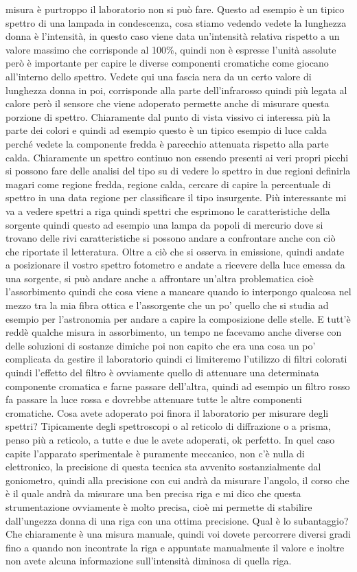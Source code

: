 misura è purtroppo il laboratorio non si può fare. Questo ad esempio è un tipico spettro di una lampada in condescenza, cosa stiamo vedendo vedete la lunghezza donna è l'intensità, in questo caso viene data un'intensità relativa rispetto a un valore massimo che corrisponde al 100\%, quindi non è espresse l'unità assolute però è importante per capire le diverse componenti cromatiche come giocano all'interno dello spettro. Vedete qui una fascia nera da un certo valore di lunghezza donna in poi, corrisponde alla parte dell'infrarosso quindi più legata al calore però il sensore che viene adoperato permette anche di misurare questa porzione di spettro. Chiaramente dal punto di vista vissivo ci interessa più la parte dei colori e quindi ad esempio questo è un tipico esempio di luce calda perché vedete la componente fredda è parecchio attenuata rispetto alla parte calda. Chiaramente un spettro continuo non essendo presenti ai veri propri picchi si possono fare delle analisi del tipo su di vedere lo spettro in due regioni definirla magari come regione fredda, regione calda, cercare di capire la percentuale di spettro in una data regione per classificare il tipo insurgente. Più interessante mi va a vedere spettri a riga quindi spettri che esprimono le caratteristiche della sorgente quindi questo ad esempio una lampa da popoli di mercurio dove si trovano delle rivi caratteristiche si possono andare a confrontare anche con ciò che riportate il letteratura. Oltre a ciò che si osserva in emissione, quindi andate a posizionare il vostro spettro fotometro e andate a ricevere della luce emessa da una sorgente, si può andare anche a affrontare un'altra problematica cioè l'assorbimento quindi che cosa viene a mancare quando io interpongo qualcosa nel mezzo tra la mia fibra ottica e l'assorgente che un po' quello che si studia ad esempio per l'astronomia per andare a capire la composizione delle stelle. E tutt'è reddè qualche misura in assorbimento, un tempo ne facevamo anche diverse con delle soluzioni di sostanze dimiche poi non capito che era una cosa un po' complicata da gestire il laboratorio quindi ci limiteremo l'utilizzo di filtri colorati quindi l'effetto del filtro è ovviamente quello di attenuare una determinata componente cromatica e farne passare dell'altra, quindi ad esempio un filtro rosso fa passare la luce rossa e dovrebbe attenuare tutte le altre componenti cromatiche. Cosa avete adoperato poi finora il laboratorio per misurare degli spettri? Tipicamente degli spettroscopi o al reticolo di diffrazione o a prisma, penso più a reticolo, a tutte e due le avete adoperati, ok perfetto. In quel caso capite l'apparato sperimentale è puramente meccanico, non c'è nulla di elettronico, la precisione di questa tecnica sta avvenito sostanzialmente dal goniometro, quindi alla precisione con cui andrà da misurare l'angolo, il corso che è il quale andrà da misurare una ben precisa riga e mi dico che questa strumentazione ovviamente è molto precisa, cioè mi permette di stabilire dall'ungezza donna di una riga con una ottima precisione. Qual è lo subantaggio? Che chiaramente è una misura manuale, quindi voi dovete percorrere diversi gradi fino a quando non incontrate la riga e appuntate manualmente il valore e inoltre non avete alcuna informazione sull'intensità diminosa di quella riga. 